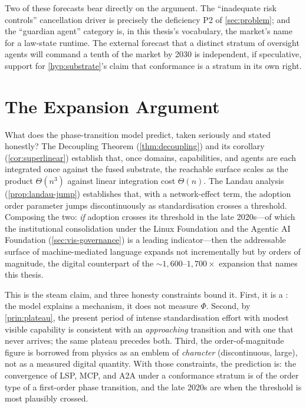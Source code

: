 Two of these forecasts bear directly on the argument. The ``inadequate risk
controls'' cancellation driver is precisely the deficiency P2 of
\cref{sec:problem}; and the ``guardian agent'' category is, in this thesis's
vocabulary, the market's name for a law-state runtime. The external forecast that a
distinct stratum of oversight agents will command a tenth of the market by 2030 is
independent, if speculative, support for \cref{hyp:substrate}'s claim that
conformance is a stratum in its own right.

\section{The Expansion Argument}
\label{sec:vis-expansion}

What does the phase-transition model predict, taken seriously and stated honestly?
The Decoupling Theorem (\cref{thm:decoupling}) and its corollary
(\cref{cor:superlinear}) establish that, once domains, capabilities, and agents are
each integrated once against the fused substrate, the reachable surface scales as
the product $\Theta(n^3)$ against linear integration cost $\Theta(n)$. The Landau
analysis (\cref{prop:landau-jump}) establishes that, with a network-effect term,
the adoption order parameter jumps discontinuously as standardisation crosses a
threshold. Composing the two: \emph{if} adoption crosses its threshold in the late
2020s---of which the institutional consolidation under the Linux Foundation and the
Agentic AI Foundation (\cref{sec:vis-governance}) is a leading indicator---then the
addressable surface of machine-mediated language expands not incrementally but by
orders of magnitude, the digital counterpart of the ${\sim}1{,}600$--$1{,}700\times$
expansion that names this thesis.

This is the steam claim, and three honesty constraints bound it. First, it is a
\forecast: the model explains a mechanism, it does not measure $\Phi$. Second, by
\cref{prin:plateau}, the present period of intense standardisation effort with
modest visible capability is consistent with an \emph{approaching} transition and
with one that never arrives; the same plateau precedes both. Third, the
order-of-magnitude figure is borrowed from physics as an emblem of \emph{character}
(discontinuous, large), not as a measured digital quantity. With those constraints,
the prediction is: the convergence of LSP, MCP, and A2A under a conformance stratum
is of the order type of a first-order phase transition, and the late 2020s are
when the threshold is most plausibly crossed.

